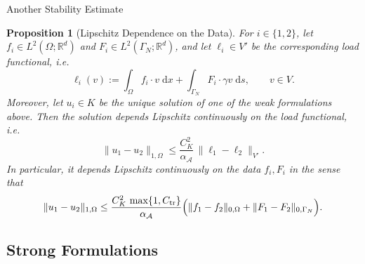 \documentclass[10pt,aspectratio=169]{beamer}
\newtheorem{proposition}{Proposition}[section]
\def\d{{\mathrm{d}}}
\def\dx{{\d x}}
\def\ds{{\d s}}
\begin{document}
\begin{frame}{Another Stability Estimate}
	\begin{proposition}[Lipschitz Dependence on the Data]
		For $i\in\{1,2\}$, let $f_i\in L^2(\Omega;\mathbb R^d)$ and $F_i\in L^2(\Gamma_N;\mathbb R^d)$, and let $\ell_i\in V'$ be the corresponding load functional, i.e.
		\begin{equation*}
			\ell_i(v):=\int_\Omega f_i\cdot v\;\dx+\int_{\Gamma_N} F_i\cdot \gamma v\;\ds,
			\qquad v\in V.
		\end{equation*}
		Moreover, let $u_i\in K$ be the unique solution of one of the weak formulations above. Then the solution depends Lipschitz continuously on the load functional, i.e.
		\begin{equation*}
			\|u_1-u_2\|_{1,\Omega}\le \frac{C_K^2}{\alpha_\mathcal{A}}\,\|\ell_1-\ell_2\|_{V'}.
		\end{equation*}
		In particular, it depends Lipschitz continuously on the data $f_i,F_i$ in the sense that
		\begin{equation*}
			\|u_1-u_2\|_{1,\Omega}
			\le \frac{C_K^2\,\max\{1,C_\mathrm{tr}\}}{\alpha_\mathcal{A}}
			\Bigl(\|f_1-f_2\|_{0,\Omega}+\|F_1-F_2\|_{0,\Gamma_N}\Bigr).
		\end{equation*}
	\end{proposition}
\end{frame}

\subsection{Strong Formulations}
\end{document}

